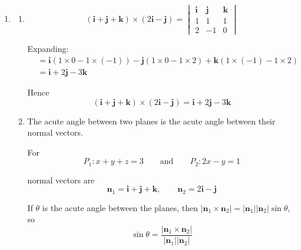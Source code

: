 \documentclass[leqno]{article}
\begin{document}
\begin{enumerate}[
  label=\textbf{\arabic*.},
  leftmargin=*,
  topsep=0pt,
  partopsep=0pt,
  parsep=0pt
]
\begin{djsSolution}
\begin{enumerate}[label=\textbf{(\alph*)}]
So a general point on $CD$ is
\[
(x,y,z)=(t,t,2-t)
\]

First, substitute into $P_1:x+y+z=3$:
\begin{align*}
t+t+(2-t)&=3 \\
t+2&=3 \\
t&=1
\end{align*}

Now substitute into $P_2:2x-y=1$:
\begin{align*}
2t-t&=1 \\
t&=1
\end{align*}

Both planes are met when $t=1$, so the line $CD$ meets $P_1$ and $P_2$ at the same point.

When $t=1$:
\[
(x,y,z)=(1,1,2-1)=(1,1,1)
\]

Therefore the common point is $(1,1,1)$.

  \item \begin{enumerate}[label=(\roman*)]
    \item
\[
(\mathbf i+\mathbf j+\mathbf k)\times(2\mathbf i-\mathbf j)
=
\begin{vmatrix}
\mathbf i & \mathbf j & \mathbf k \\
1 & 1 & 1 \\
2 & -1 & 0
\end{vmatrix}
\]

Expanding:
\begin{align*}
&=\mathbf i(1\times 0-1\times(-1))
-\mathbf j(1\times 0-1\times 2)
+\mathbf k(1\times(-1)-1\times 2) \\
&=\mathbf i+2\mathbf j-3\mathbf k
\end{align*}

Hence
\[
(\mathbf i+\mathbf j+\mathbf k)\times(2\mathbf i-\mathbf j)=\mathbf i+2\mathbf j-3\mathbf k
\]

    \item The acute angle between two planes is the acute angle between their normal vectors.

For
\[
P_1:x+y+z=3 \qquad \text{and} \qquad P_2:2x-y=1
\]

normal vectors are
\[
\mathbf n_1=\mathbf i+\mathbf j+\mathbf k, \qquad \mathbf n_2=2\mathbf i-\mathbf j
\]

If $\theta$ is the acute angle between the planes, then $\left\lvert \mathbf n_1\times \mathbf n_2\right\rvert=\left\lvert \mathbf n_1\right\rvert\left\lvert \mathbf n_2\right\rvert\sin\theta$, so
\[
\sin\theta=\frac{\left\lvert \mathbf n_1\times \mathbf n_2\right\rvert}{\left\lvert \mathbf n_1\right\rvert\left\lvert \mathbf n_2\right\rvert}
\]


\end{enumerate}
\end{enumerate}
\end{djsSolution}
\end{enumerate}
\end{document}
